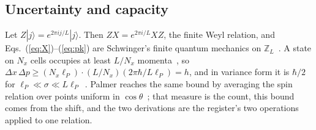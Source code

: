 \documentclass[aps,prd,twocolumn,superscriptaddress,nofootinbib]{revtex4-2}
\begin{document}
\subsection{Uncertainty and capacity}
\label{sec:capacity}

Let $Z|j\rangle = e^{2\pi ij/L}|j\rangle$. Then $ZX = e^{2\pi i/L}XZ$, the finite Weyl relation, and Eqs.~(\ref{eq:X})--(\ref{eq:pk}) are Schwinger's finite quantum mechanics on $\mathbb{Z}_L$~\cite{weyl1931,schwinger1960,vourdas2004}. A state on $N_x$ cells occupies at least $L/N_x$ momenta~\cite{donoho1989}, so $\Delta x\,\Delta p \ge (N_x\ell_P)\cdot(L/N_x)(2\pi\hbar/L\ell_P) = h$, and in variance form it is $\hbar/2$ for $\ell_P\ll\sigma\ll L\ell_P$~\cite{massar2008}. Palmer reaches the same bound by averaging the spin relation over points uniform in $\cos\theta$~\cite{palmer2026c}; that measure is the count, this bound comes from the shift, and the two derivations are the register's two operations applied to one relation.
\end{document}
